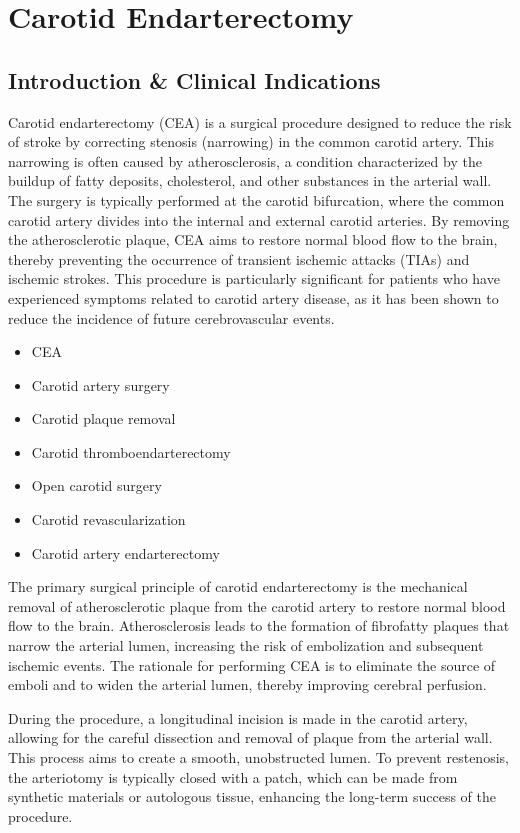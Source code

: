 \chapter{Carotid Endarterectomy}

\section*{Introduction \& Clinical Indications}
Carotid endarterectomy (CEA) is a surgical procedure designed to reduce the risk of stroke by correcting stenosis (narrowing) in the common carotid artery. This narrowing is often caused by atherosclerosis, a condition characterized by the buildup of fatty deposits, cholesterol, and other substances in the arterial wall. The surgery is typically performed at the carotid bifurcation, where the common carotid artery divides into the internal and external carotid arteries. By removing the atherosclerotic plaque, CEA aims to restore normal blood flow to the brain, thereby preventing the occurrence of transient ischemic attacks (TIAs) and ischemic strokes. This procedure is particularly significant for patients who have experienced symptoms related to carotid artery disease, as it has been shown to reduce the incidence of future cerebrovascular events.

\begin{itemize}
  \item CEA
  \item Carotid artery surgery
  \item Carotid plaque removal
  \item Carotid thromboendarterectomy
  \item Open carotid surgery
  \item Carotid revascularization
  \item Carotid artery endarterectomy
\end{itemize}

The primary surgical principle of carotid endarterectomy is the mechanical removal of atherosclerotic plaque from the carotid artery to restore normal blood flow to the brain. Atherosclerosis leads to the formation of fibrofatty plaques that narrow the arterial lumen, increasing the risk of embolization and subsequent ischemic events. The rationale for performing CEA is to eliminate the source of emboli and to widen the arterial lumen, thereby improving cerebral perfusion.

During the procedure, a longitudinal incision is made in the carotid artery, allowing for the careful dissection and removal of plaque from the arterial wall. This process aims to create a smooth, unobstructed lumen. To prevent restenosis, the arteriotomy is typically closed with a patch, which can be made from synthetic materials or autologous tissue, enhancing the long-term success of the procedure.

